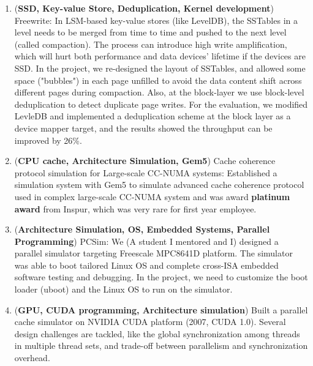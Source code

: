 \documentclass{article}
\begin{document}
\begin{enumerate}
\item (\textbf{SSD, Key-value Store, Deduplication, Kernel development}) Freewrite: In LSM-based key-value stores (like LevelDB), the SSTables in a level needs to be merged from time to time and pushed to the next level (called compaction). The process can introduce high write amplification, which will hurt both performance and data devices' lifetime if the devices are SSD. In the project, we re-designed the layout of SSTables, and allowed some space ("bubbles") in each page unfilled to avoid the data content shift across different pages during compaction. Also, at the block-layer we use block-level deduplication to detect duplicate page writes.
For the evaluation, we modified LevleDB and implemented a deduplication scheme at the block layer as a device mapper target, and the results showed the throughput can be improved by 26\%.
\item (\textbf{CPU cache, Architecture Simulation, Gem5}) Cache coherence protocol simulation for Large-scale CC-NUMA systems: Established a simulation system with Gem5 to simulate advanced cache coherence protocol used in complex large-scale CC-NUMA system and was award \textbf{platinum award} from Inspur, which was very rare for first year employee.
\item (\textbf{Architecture Simulation, OS, Embedded Systems, Parallel Programming})	PCSim: We (A student I mentored and I) designed a parallel simulator targeting Freescale MPC8641D platform. The simulator was able to boot tailored Linux OS and complete cross-ISA embedded software testing and debugging. In the project, we need to customize the boot loader (uboot) and the Linux OS to run on the simulator.
\item (\textbf{GPU, CUDA programming, Architecture simulation})	Built a parallel cache simulator on NVIDIA CUDA platform (2007, CUDA 1.0). 
Several design challenges are tackled, like the global synchronization among threads in multiple thread sets, and trade-off between parallelism and synchronization overhead.
\end{enumerate}
\end{document}
